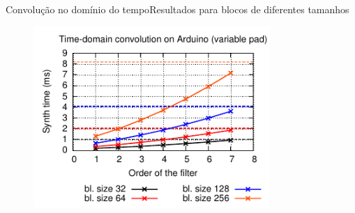 \begin{frame}{Convolução no domínio do tempo}{Resultados para blocos de diferentes tamanhos}
\begin{figure}
\includegraphics[width=0.8\textwidth]{./img/convolution-comparison-vpad.pdf}
\end{figure}
\end{frame}


